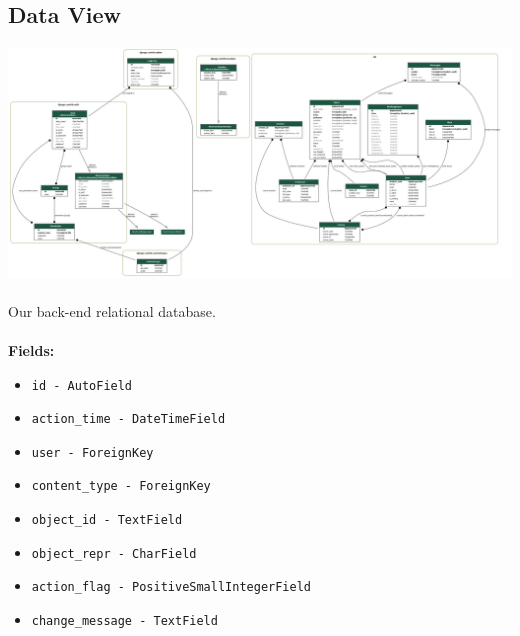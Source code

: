 \documentclass[oneside,openany,obeyspaces]{book}
\newcommand\tab[1][1cm]{\hspace*{#1}}
\begin{document}
\begin{flushleft}
    \section{Data View}

    \includegraphics[width=160mm,scale=0.5]{img/erd.png}\\~\\

    \tab Our back-end relational database.\\~\\

    \textbf{Fields:}
    \begin{itemize}
        \item \texttt{id - AutoField}
        \item \texttt{action\_time - DateTimeField}
        \item \texttt{user - ForeignKey}
        \item \texttt{content\_type - ForeignKey}
        \item \texttt{object\_id - TextField}
        \item \texttt{object\_repr - CharField}
        \item \texttt{action\_flag - PositiveSmallIntegerField}
        \item \texttt{change\_message - TextField}
    \end{itemize}


\end{flushleft}
\end{document}
